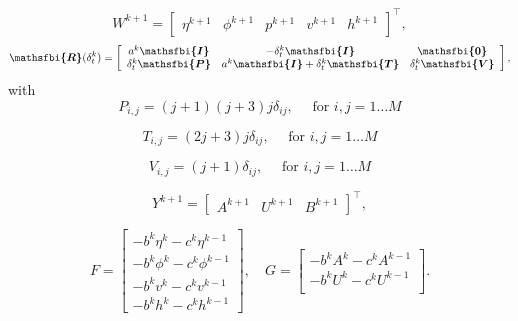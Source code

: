\documentclass{jfm}
\newcommand{\bfjfm}[1]{\bm{\mathsfbi{#1}}}
\begin{document}
 \begin{equation}
    \label{eqn:W_independent_vector_Def}
     W^{k+1} = 
     \left[
     \begin{array}{ccccc}
          \eta^{k+1} & \phi^{k+1} & p^{k+1} & v^{k+1} & h^{k+1}
     \end{array}
     \right]^{\top},
 \end{equation}
\begin{equation}
     \label{eqn:bath_matrix_form_2}
     \bfjfm{R}(\delta_t^k) 
     =
     \left[
    \begin{array}{ccc}
        a^k\bfjfm{I} 
        & -\delta_t^k\bfjfm{I}
        & \bfjfm{0}%
        \\
        \delta^k_t\bfjfm{P}
        & 
        a^k \bfjfm{I} + \delta^k_t \bfjfm{T}
        & 
        \delta^k_t \bfjfm{V}
    \end{array}
    \right],
 \end{equation}
 with
 \begin{equation}
     P_{i, j} = (j+1)(j+3)j\delta_{ij}
             , \quad \text{ for } i, j = 1 \dots M
 \end{equation}

  \begin{equation}
     T_{i, j} =  (2j+3)j\delta_{ij}
             , \quad \text{ for } i, j = 1 \dots M
 \end{equation}

\begin{equation}
     V_{i, j} =  (j+1)\delta_{ij}
             , \quad \text{ for } i, j = 1 \dots M
 \end{equation}
 
  \begin{equation}
  \label{eqn:Y_definition}
     Y^{k+1} = 
     \left[
     \begin{array}{ccc}
          A^{k+1} & U^{k+1} & B^{k+1}
     \end{array}
     \right]^{\top},
 \end{equation}
 

 \begin{equation}
     F = 
     \left[
     \begin{array}{c}
          - b^k \eta^{k} - c^k \eta^{k-1} \\
          -b^k \phi^{k} - c^k \phi^{k-1} \\
          -b^k v^k - c^k v^{k-1} \\
          -b^k h^k - c^k h^{k-1}
     \end{array}
     \right],
     \quad
     G =
     \left[
     \begin{array}{c}
          - b^k A^{k} - c^k A^{k-1} \\
          -b^k U^{k} - c^k U^{k-1} \\
     \end{array}
     \right].
 \end{equation}
\end{document}

